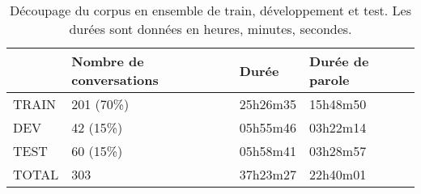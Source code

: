 \begin{table}[h]
  \centering
\begin{tabular}{|l|l|l|l|}
\hline
      & Nombre de conversations & Durée    & Durée de parole \\ \hline
TRAIN & 201  (70\%)             & 25h26m35 & 15h48m50        \\ \hline
DEV   & 42   (15\%)             & 05h55m46 & 03h22m14        \\ \hline
TEST  & 60   (15\%)             & 05h58m41 & 03h28m57        \\ \hline
TOTAL & 303                     & 37h23m27 & 22h40m01        \\ \hline
\end{tabular}
\caption{Découpage du corpus en ensemble de train, développement et test. Les durées sont données en heures, minutes, secondes.}
\label{tab:repartitionEnSets}
\end{table}
